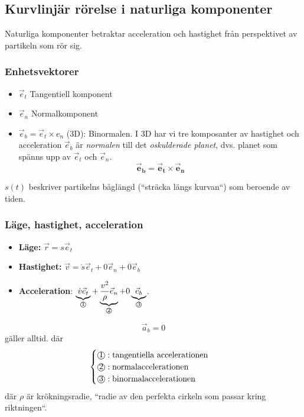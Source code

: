 \documentclass{article}
\newenvironment{ankiflashcard}[1]{}{}
\newcommand{\numbercircle}[1]{
\text{\textcircled{#1}}
}
\newcommand{\numbercirclewithunderbrace}[2]{
\underbrace{#1}_{\numbercircle{#2}}
}
\begin{document}
\begin{paracol}{2}
\subsection{Kurvlinjär rörelse i naturliga komponenter}
Naturliga komponenter betraktar acceleration och hastighet från perspektivet av partikeln som rör sig.

\subsubsection{Enhetsvektorer}
\begin{itemize}
    \item $\vec e_t$ Tangentiell komponent
    \item  $\vec e_n$ Normalkomponent
    \item $\vec e_b=\vec e_t \times e_n$ (3D): Binormalen. I 3D har vi tre komposanter av hastighet och acceleration $\vec e_b$ är \textit{normalen} till det \textit{oskulderade planet}, dvs. planet som spänns upp av $\vec e_t$ och $\vec e_n$.
    $$\boxed{\mathbf{\vec e_b = \vec e_t \times \vec e_n}}$$
\end{itemize}
$s(t)$ beskriver partikelns båglängd (``sträcka längs kurvan``) som beroende av tiden.

\begin{ankiflashcard}{Ange ekvationer för läge, hastighet och acceleration i naturliga komponenter.}
    
\subsubsection{Läge, hastighet, acceleration}
\begin{itemize}
    \item \textbf{Läge:} $\vec r = s \vec e_t$
    \item \textbf{Hastighet:} $\vec v = \dot s \vec e_t+0 \vec e_n + 0 \vec e_b$
    \item \textbf{Acceleration}: $\numbercirclewithunderbrace{\dot v \vec e_t}{1} + \numbercirclewithunderbrace{\frac{v^2}{\rho} \vec e_n}{2} + 0\numbercirclewithunderbrace{\vec e_b}{3}$. 
\end{itemize}
$$\vec a_b = 0$$ gäller alltid.
där $$\begin{cases}
    \numbercircle{1}: \text{tangentiella accelerationen}\\
    \numbercircle{2}: \text{normalaccelerationen} \\
    \numbercircle{3}: \text{binormalaccelerationen} \\
\end{cases}$$
där $\rho$ är krökningsradie, ``radie av den perfekta cirkeln som passar kring riktningen``.
\end{ankiflashcard}


\end{paracol}
\end{document}
